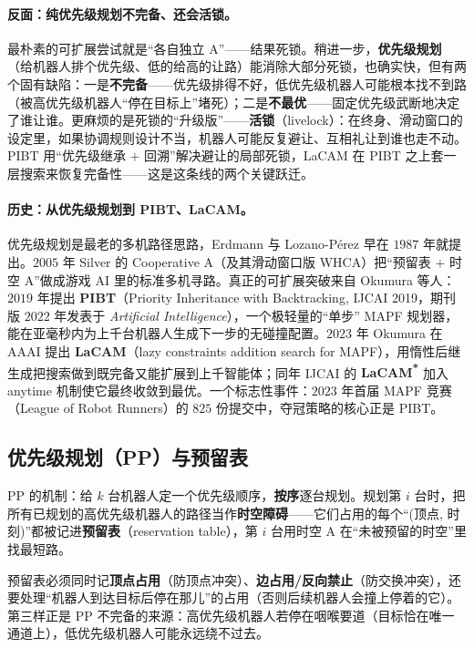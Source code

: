 \paragraph{反面：纯优先级规划不完备、还会活锁。}
最朴素的可扩展尝试就是“各自独立 A\*”——结果死锁。稍进一步，\textbf{优先级规划}（给机器人排个优先级、低的给高的让路）能消除大部分死锁，也确实快，但有两个固有缺陷：一是\textbf{不完备}——优先级排得不好，低优先级机器人可能根本找不到路（被高优先级机器人“停在目标上”堵死）；二是\textbf{不最优}——固定优先级武断地决定了谁让谁。更麻烦的是死锁的“升级版”——\textbf{活锁}（livelock）：在终身、滑动窗口的设定里，如果协调规则设计不当，机器人可能反复避让、互相礼让到谁也走不动。PIBT 用“优先级继承 $+$ 回溯”解决避让的局部死锁，LaCAM 在 PIBT 之上套一层搜索来恢复完备性——这是这条线的两个关键跃迁。

\paragraph{历史：从优先级规划到 PIBT、LaCAM。}
优先级规划是最老的多机路径思路，Erdmann 与 Lozano-P\'erez 早在 $1987$ 年就提出\cite{erdmann1987multiple}。$2005$ 年 Silver 的 Cooperative A\*（及其滑动窗口版 WHCA\*）把“预留表 $+$ 时空 A\*”做成游戏 AI 里的标准多机寻路\cite{silver2005cooperative}。真正的可扩展突破来自 Okumura 等人：$2019$ 年提出 \textbf{PIBT}（Priority Inheritance with Backtracking, IJCAI 2019，期刊版 $2022$ 年发表于 \emph{Artificial Intelligence}）\cite{okumura2022pibt}，一个极轻量的“单步” MAPF 规划器，能在亚毫秒内为上千台机器人生成下一步的无碰撞配置。$2023$ 年 Okumura 在 AAAI 提出 \textbf{LaCAM}（lazy constraints addition search for MAPF）\cite{okumura2023lacam}，用惰性后继生成把搜索做到既完备又能扩展到上千智能体；同年 IJCAI 的 \textbf{LaCAM\textsuperscript{*}} 加入 anytime 机制使它最终收敛到最优\cite{okumura2023lacamstar}。一个标志性事件：$2023$ 年首届 MAPF 竞赛（League of Robot Runners）的 $825$ 份提交中，夺冠策略的核心正是 PIBT。

\subsection{优先级规划（PP）与预留表}
\label{sec:mapf-pp}

PP 的机制：给 $k$ 台机器人定一个优先级顺序，\textbf{按序}逐台规划。规划第 $i$ 台时，把所有已规划的高优先级机器人的路径当作\textbf{时空障碍}——它们占用的每个“(顶点, 时刻)”都被记进\textbf{预留表}（reservation table），第 $i$ 台用时空 A\* 在“未被预留的时空”里找最短路。

\begin{insight}[预留表必须记三样东西]
预留表必须同时记\textbf{顶点占用}（防顶点冲突）、\textbf{边占用/反向禁止}（防交换冲突），还要处理“机器人到达目标后停在那儿”的占用（否则后续机器人会撞上停着的它）。第三样正是 PP 不完备的来源：高优先级机器人若停在咽喉要道（目标恰在唯一通道上），低优先级机器人可能永远绕不过去。
\end{insight}

